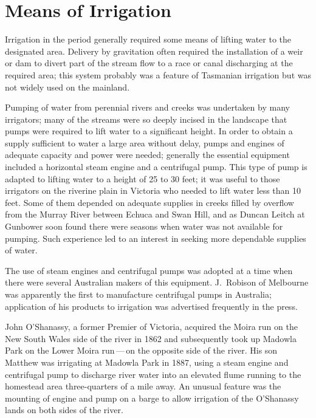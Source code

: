 \section*{Means of Irrigation}

Irrigation in the period generally required some means of lifting
water to the designated area.  Delivery by gravitation often required
the installation of a weir or
dam to divert part of the stream flow to a race
or canal discharging at the required area;
this system probably was a feature of Tasmanian irrigation but was not
widely used on the mainland.

Pumping of water from perennial rivers and creeks was undertaken by
many irrigators; many of the streams were so deeply incised in the
landscape that pumps were required to lift water to a significant
height.  In order to obtain a supply sufficient to water a large area
without delay, pumps and engines of adequate capacity and power were
needed; generally the essential equipment included a horizontal steam
engine and a centrifugal pump. %
 This type of pump is adapted to
lifting water to a height of 25 to 30 feet; it was useful to those
irrigators on the riverine plain in Victoria who needed to lift water
less than 10 feet.  Some of them depended on adequate supplies in
creeks filled by overflow from the Murray River 
between Echuca  and Swan Hill,  and as Duncan Leitch   at Gunbower soon found
there were seasons when water was not available for pumping.  Such
experience led to an interest in seeking more dependable supplies of
water.

The use of steam engines and centrifugal pumps was adopted at a time
when there were several Australian makers of this equipment.
J.~Robison  of Melbourne was apparently the first
to manufacture centrifugal %
pumps in Australia; application of his
products to irrigation was advertised frequently in the
press.

John O'Shanassy,  a former Premier of Victoria,
acquired the Moira  run on the New South Wales
side of the river in 1862 and subsequently took up Madowla Park
  on the Lower Moira run\,---\,on the
opposite si\-de of the river.  His son Matthew 
was irrigating at Madowla Park in 1887, using a steam engine and
centrifugal pump  to
discharge river water into an elevated flume running to the homestead
area three-quarters of a mile away. An unusual feature was the
mounting of engine and pump on a barge to allow irrigation of the
O'Shanassy lands on both sides of the river.

